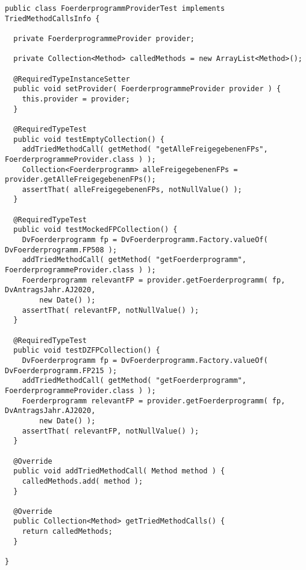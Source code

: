 \begin{lstlisting}[style = java, caption = Interface FoerderprogrammProviderTest, captionpos = b, label = lst_testklassen_tei2]
public class FoerderprogrammProviderTest implements TriedMethodCallsInfo {

  private FoerderprogrammeProvider provider;

  private Collection<Method> calledMethods = new ArrayList<Method>();

  @RequiredTypeInstanceSetter
  public void setProvider( FoerderprogrammeProvider provider ) {
    this.provider = provider;
  }

  @RequiredTypeTest
  public void testEmptyCollection() {
    addTriedMethodCall( getMethod( "getAlleFreigegebenenFPs", FoerderprogrammeProvider.class ) );
    Collection<Foerderprogramm> alleFreigegebenenFPs = provider.getAlleFreigegebenenFPs();
    assertThat( alleFreigegebenenFPs, notNullValue() );
  }

  @RequiredTypeTest
  public void testMockedFPCollection() {
    DvFoerderprogramm fp = DvFoerderprogramm.Factory.valueOf( DvFoerderprogramm.FP508 );
    addTriedMethodCall( getMethod( "getFoerderprogramm", FoerderprogrammeProvider.class ) );
    Foerderprogramm relevantFP = provider.getFoerderprogramm( fp, DvAntragsJahr.AJ2020,
        new Date() );
    assertThat( relevantFP, notNullValue() );
  }

  @RequiredTypeTest
  public void testDZFPCollection() {
    DvFoerderprogramm fp = DvFoerderprogramm.Factory.valueOf( DvFoerderprogramm.FP215 );
    addTriedMethodCall( getMethod( "getFoerderprogramm", FoerderprogrammeProvider.class ) );
    Foerderprogramm relevantFP = provider.getFoerderprogramm( fp, DvAntragsJahr.AJ2020,
        new Date() );
    assertThat( relevantFP, notNullValue() );
  }

  @Override
  public void addTriedMethodCall( Method method ) {
    calledMethods.add( method );
  }

  @Override
  public Collection<Method> getTriedMethodCalls() {
    return calledMethods;
  }

}
\end{lstlisting}
